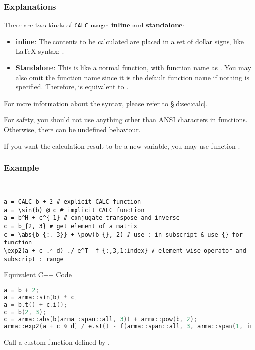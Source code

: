 \subsubsection*{Explanations}
There are two kinds of \texttt{CALC} usage: \textbf{inline} and \textbf{standalone}:
\begin{itemize}
  \item \textbf{inline}: The contents to be calculated are placed in a set of dollar signs,
  like \LaTeX{} syntax: .
  \item \textbf{Standalone}: This is like a normal function, with function name as .
  You may also omit the function name  since it is the default function name
  if nothing is specified.
  Therefore,  is equivalent to .
\end{itemize}
For more information about the  syntax,
please refer to \S\ref{d:sec:calc}.
\begin{warning}
  For safety, you should not use anything other than ANSI characters in  functions.
  Otherwise, there can be undefined behaviour.
\end{warning}
If you want the calculation result to be a new variable,
you may use function .
\subsubsection*{Example}
\begin{example}~
  \begin{lstlisting}[language=mmcesim-sim]
a = CALC b + 2 # explicit CALC function
a = \sin(b) @ c # implicit CALC function
a = b^H + c^{-1} # conjugate transpose and inverse
c = b_{2, 3} # get element of a matrix
c = \abs{b_{:, 3}} + \pow(b_{}, 2) # use : in subscript & use {} for function
\exp2(a + c .* d) ./ e^T -f_{:,3,1:index} # element-wise operator and subscript : range
  \end{lstlisting}
  Equivalent C++ Code
  \begin{lstlisting}[language=c++,morekeywords={sin,abs,exp2,pow}]
a = b + 2;
a = arma::sin(b) * c;
a = b.t() + c.i();
c = b(2, 3);
c = arma::abs(b(arma::span::all, 3)) + arma::pow(b, 2);
arma::exp2(a + c % d) / e.st() - f(arma::span::all, 3, arma::span(1, index));
  \end{lstlisting}
\end{example}

Call a custom function defined by .

